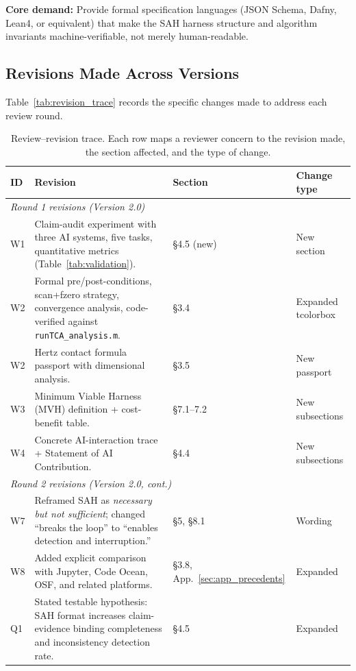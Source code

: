 \documentclass{article}
\begin{document}
\textbf{Core demand:} Provide formal specification languages (JSON Schema, Dafny, Lean4, or equivalent) that make the SAH harness structure and algorithm invariants machine-verifiable, not merely human-readable.

\subsection{Revisions Made Across Versions}

Table~\ref{tab:revision_trace} records the specific changes made to address each review round.

\begin{table}[t]
\centering
\caption{Review--revision trace. Each row maps a reviewer concern to the revision made, the section affected, and the type of change.}
\small
\begin{tabular}{p{1.2cm}p{4.8cm}p{3.5cm}p{3.5cm}}
\toprule
\textbf{ID} & \textbf{Revision} & \textbf{Section} & \textbf{Change type} \\
\midrule
\multicolumn{4}{l}{\textit{Round 1 revisions (Version 2.0)}} \\
W1 & Claim-audit experiment with three AI systems, five tasks, quantitative metrics (Table~\ref{tab:validation}). & \S4.5 (new) & New section \\
W2 & Formal pre/post-conditions, scan+fzero strategy, convergence analysis, code-verified against \texttt{runTCA\_analysis.m}. & \S3.4 & Expanded tcolorbox \\
W2 & Hertz contact formula passport with dimensional analysis. & \S3.5 & New passport \\
W3 & Minimum Viable Harness (MVH) definition + cost-benefit table. & \S7.1--7.2 & New subsections \\
W4 & Concrete AI-interaction trace + Statement of AI Contribution. & \S4.4 & New subsections \\
\midrule
\multicolumn{4}{l}{\textit{Round 2 revisions (Version 2.0, cont.)}} \\
W7 & Reframed SAH as \emph{necessary but not sufficient}; changed ``breaks the loop'' to ``enables detection and interruption.'' & \S5, \S8.1 & Wording \\
W8 & Added explicit comparison with Jupyter, Code Ocean, OSF, and related platforms. & \S3.8, App.~\ref{sec:app_precedents} & Expanded \\
Q1 & Stated testable hypothesis: SAH format increases claim-evidence binding completeness and inconsistency detection rate. & \S4.5 & Expanded \\

\end{tabular}
\end{table}
\end{document}

